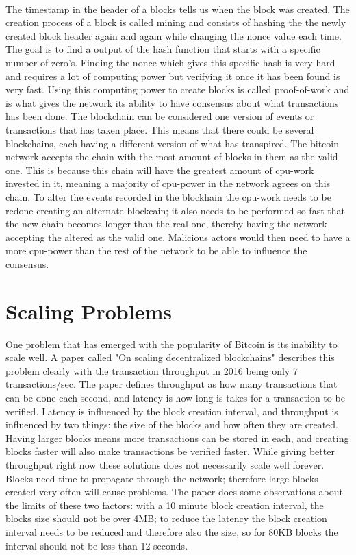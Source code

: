 \documentclass[informationsecurity]{gucmasterproject}
\begin{document}
\paragraph{}
The timestamp in the header of a blocks tells us when the block was created. The creation process of a block is called mining and consists of hashing the the newly created block header again and again while changing the nonce value each time. The goal is to find a output of the hash function that starts with a specific number of zero's. Finding the nonce which gives this specific hash is very hard and requires a lot of computing power but verifying it once it has been found is very fast. Using this computing power to create blocks is called proof-of-work and is what gives the network its ability to have consensus about what transactions has been done. The blockchain can be considered one version of events or transactions that has taken place. This means that there could be several blockchains, each having a different version of what has transpired. The bitcoin network accepts the chain with the most amount of blocks in them as the valid one. This is because this chain will have the greatest amount of cpu-work invested in it, meaning a majority of cpu-power in the network agrees on this chain. To alter the events recorded in the blockhain the cpu-work needs to be redone creating an alternate blockcain; it also needs to be performed so fast that the new chain becomes longer than the real one, thereby having the network accepting the altered as the valid one.
Malicious actors would then need to have a more cpu-power than the rest of the network to be able to influence the consensus.


\section{Scaling Problems}

One problem that has emerged with the popularity of Bitcoin is its inability to scale well.
A paper called "On scaling decentralized blockchains"\cite{croman2016scaling} describes this problem clearly with the transaction throughput in 2016 being only 7 transactions/sec.
The paper defines throughput as how many transactions that can be done each second, and latency is how long is takes for a transaction to be verified. Latency is influenced by the block creation interval, and throughput is influenced by two things: the size of the blocks and how often they are created. Having larger blocks means more transactions can be stored in each, and creating blocks faster will also make transactions be verified faster. While giving better throughput right now these solutions does not necessarily scale well forever. Blocks need time to propagate through the network; therefore large blocks created very often will cause problems. The paper does some observations about the limits of these two factors: with a 10 minute block creation interval, the blocks size should not be over 4MB; to reduce the latency the block creation interval needs to be reduced and therefore also the size, so for 80KB blocks the interval should not be less than 12 seconds.
\end{document}
